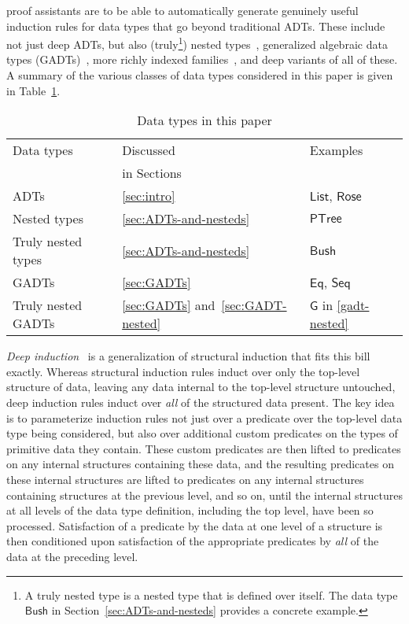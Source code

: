 \documentclass[sigplan,10pt]{acmart}
\begin{document}
proof assistants are to be
able to automatically generate genuinely useful induction rules for
data types that go
beyond traditional ADTs. These
include not just deep ADTs, but also (truly\footnote{A truly nested
  type is a nested type that is defined over itself. The data type
  $\mathsf{Bush}$ in Section~\ref{sec:ADTs-and-nesteds} provides a
  concrete example.}) nested types~\cite{bm98},
generalized algebraic data types
(GADTs)~\cite{ch03,pvww06,sp04,xcc03}, more richly indexed
families~\cite{dyb94}, and deep variants of all of these. A summary of
the various classes of data types considered in this paper is given in
Table~\ref{fig:taxonomy}.

\begin{table}[h!]
\begin{tabular}{|l|l|l|}
\hline
Data types & Discussed & Examples \\
          & in Sections &          \\
\hline\hline
ADTs & \ref{sec:intro} &
$\mathsf{List}$, $\mathsf{Rose}$ \\ 
Nested types & \ref{sec:ADTs-and-nesteds} & $\mathsf{PTree}$ \\  
Truly nested types & \ref{sec:ADTs-and-nesteds} & $\mathsf{Bush}$\\
GADTs & \ref{sec:GADTs} & $\mathsf{Eq}$, $\mathsf{Seq}$\\
Truly nested GADTs & \ref{sec:GADTs} and~\ref{sec:GADT-nested}&
$\mathsf{G}$ in \eqref{gadt-nested}\\ 
\hline
\end{tabular}
\caption{Data types in this paper}\label{fig:taxonomy}
\end{table}

{\em Deep induction}~\cite{jp20} is a generalization of structural
induction that fits this bill exactly. Whereas structural induction
rules induct over only the top-level structure of data, leaving any
data internal to the top-level structure untouched, deep induction
rules induct over {\em all} of the structured data present. The key
idea is to parameterize induction rules not just over a predicate over
the top-level data type being considered, but also over additional
custom predicates on the types of primitive data they contain. These
custom predicates are then lifted to predicates on any internal
structures containing these data, and the resulting predicates on
these internal structures are lifted to predicates on any internal
structures containing structures at the previous level, and so on,
until the internal structures at all levels of the data type
definition, including the top level, have been so
processed. Satisfaction of a predicate by the data at one level of a
structure is then conditioned upon satisfaction of the appropriate
predicates by {\em all} of the data at the preceding level.
\end{document}
